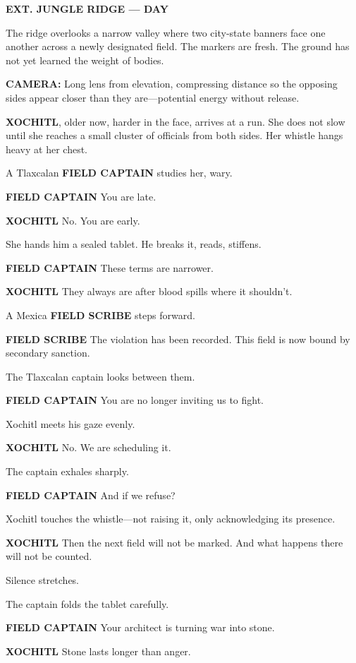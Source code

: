 \documentclass[12pt]{article}
\begin{document}
\textbf{EXT. JUNGLE RIDGE — DAY}

The ridge overlooks a narrow valley where two city-state banners face one another across a newly designated field. The markers are fresh. The ground has not yet learned the weight of bodies.

\textbf{CAMERA:} Long lens from elevation, compressing distance so the opposing sides appear closer than they are—potential energy without release.

\textbf{XOCHITL}, older now, harder in the face, arrives at a run. She does not slow until she reaches a small cluster of officials from both sides. Her whistle hangs heavy at her chest.

A Tlaxcalan \textbf{FIELD CAPTAIN} studies her, wary.

\textbf{FIELD CAPTAIN}  
You are late.

\textbf{XOCHITL}  
No.  
You are early.

She hands him a sealed tablet. He breaks it, reads, stiffens.

\textbf{FIELD CAPTAIN}  
These terms are narrower.

\textbf{XOCHITL}  
They always are after blood spills  
where it shouldn’t.

A Mexica \textbf{FIELD SCRIBE} steps forward.

\textbf{FIELD SCRIBE}  
The violation has been recorded.  
This field is now bound by secondary sanction.

The Tlaxcalan captain looks between them.

\textbf{FIELD CAPTAIN}  
You are no longer inviting us to fight.

Xochitl meets his gaze evenly.

\textbf{XOCHITL}  
No.  
We are scheduling it.

The captain exhales sharply.

\textbf{FIELD CAPTAIN}  
And if we refuse?

Xochitl touches the whistle—not raising it, only acknowledging its presence.

\textbf{XOCHITL}  
Then the next field will not be marked.  
And what happens there  
will not be counted.

Silence stretches.

The captain folds the tablet carefully.

\textbf{FIELD CAPTAIN}  
Your architect is turning war into stone.

\textbf{XOCHITL}  
Stone lasts longer than anger.
\end{document}
